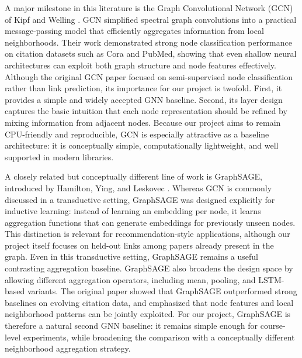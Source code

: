 \documentclass[11pt,a4paper]{article}
\begin{document}
A major milestone in this literature is the Graph Convolutional Network (GCN) of
Kipf and Welling \cite{kipf2017semi}.
GCN simplified spectral graph convolutions into a practical message-passing model
that efficiently aggregates information from local neighborhoods.
Their work demonstrated strong node classification performance on citation datasets such as
Cora and PubMed, showing that even shallow neural architectures can exploit both graph structure
and node features effectively.
Although the original GCN paper focused on semi-supervised node classification rather than link prediction,
its importance for our project is twofold.
First, it provides a simple and widely accepted GNN baseline.
Second, its layer design captures the basic intuition that each node representation should be refined
by mixing information from adjacent nodes.
Because our project aims to remain CPU-friendly and reproducible,
GCN is especially attractive as a baseline architecture:
it is conceptually simple, computationally lightweight, and well supported in modern libraries.

A closely related but conceptually different line of work is GraphSAGE,
introduced by Hamilton, Ying, and Leskovec \cite{hamilton2017inductive}.
Whereas GCN is commonly discussed in a transductive setting,
GraphSAGE was designed explicitly for inductive learning:
instead of learning an embedding per node,
it learns aggregation functions that can generate embeddings for previously unseen nodes.
This distinction is relevant for recommendation-style applications,
although our project itself focuses on held-out links among papers already present in the graph.
Even in this transductive setting, GraphSAGE remains a useful contrasting aggregation baseline.
GraphSAGE also broadens the design space by allowing different aggregation operators,
including mean, pooling, and LSTM-based variants.
The original paper showed that GraphSAGE outperformed strong baselines on evolving citation data,
and emphasized that node features and local neighborhood patterns can be jointly exploited.
For our project, GraphSAGE is therefore a natural second GNN baseline:
it remains simple enough for course-level experiments,
while broadening the comparison with a conceptually different neighborhood aggregation strategy.
\end{document}

